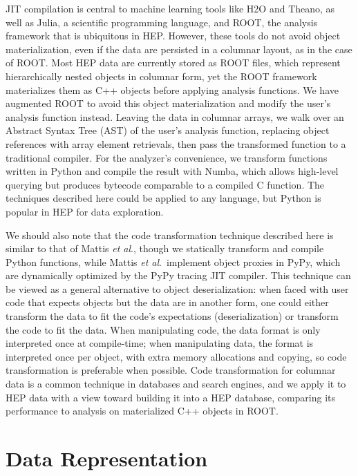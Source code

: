 \documentclass[10pt, conference, compsocconf]{IEEEtran}
\begin{document}
JIT compilation is central to machine learning tools like H2O\cite{h2o} and Theano\cite{theano}, as well as Julia\cite{julia}, a scientific programming language, and ROOT\cite{root}, the analysis framework that is ubiquitous in HEP. However, these tools do not avoid object materialization, even if the data are persisted in a columnar layout, as in the case of ROOT. Most HEP data are currently stored as ROOT files, which represent hierarchically nested objects in columnar form, yet the ROOT framework materializes them as C++ objects before applying analysis functions. We have augmented ROOT\cite{bulkio} to avoid this object materialization and modify the user's analysis function instead. Leaving the data in columnar arrays, we walk over an Abstract Syntax Tree (AST) of the user's analysis function, replacing object references with array element retrievals, then pass the transformed function to a traditional compiler. For the analyzer's convenience, we transform functions written in Python and compile the result with Numba\cite{numba}, which allows high-level querying but produces bytecode comparable to a compiled C function. The techniques described here could be applied to any language, but Python is popular in HEP for data exploration.

We should also note that the code transformation technique described here is similar to that of Mattis {\it et al}.\cite{columnarobjects}, though we statically transform and compile Python functions, while Mattis {\it et al}.\ implement object proxies in PyPy, which are dynamically optimized by the PyPy tracing JIT compiler. This technique can be viewed as a general alternative to object deserialization: when faced with user code that expects objects but the data are in another form, one could either transform the data to fit the code's expectations (deserialization) or transform the code to fit the data. When manipulating code, the data format is only interpreted once at compile-time; when manipulating data, the format is interpreted once per object, with extra memory allocations and copying, so code transformation is preferable when possible. Code transformation for columnar data is a common technique in databases and search engines\cite{searchengine}, and we apply it to HEP data with a view toward building it into a HEP database, comparing its performance to analysis on materialized C++ objects in ROOT.

\section{Data Representation}
\end{document}
